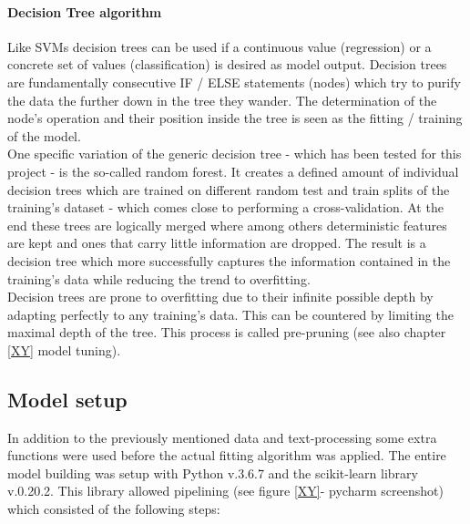 \paragraph{Decision Tree algorithm}
Like SVMs decision trees can be used if a continuous value (regression) or a concrete set of values (classification) is desired as model output. Decision trees are fundamentally consecutive IF / ELSE statements (nodes) which try to purify the data the further down in the tree they wander. The determination of the node's operation and their position inside the tree is seen as the fitting / training of the model.\\
One specific variation of the generic decision tree - which has been tested for this project - is the so-called random forest. It creates a defined amount of individual decision trees which are trained on different random test and train splits of the training's dataset - which comes close to performing a cross-validation. At the end these trees are logically merged where among others deterministic features are kept and ones that carry little information are dropped. The result is a decision tree which more successfully captures the information contained in the training's data while reducing the trend to overfitting.\\
Decision trees are prone to overfitting due to their infinite possible depth by adapting perfectly to any training's data. This can be countered by limiting the maximal depth of the tree. This process is called pre-pruning (see also chapter \ref{XY} model tuning).

\subsection{Model setup} \label{model_setup}
In addition to the previously mentioned data and text-processing some extra functions were used before the actual fitting algorithm was applied. The entire model building was setup with Python v.3.6.7 and the scikit-learn library v.0.20.2. This library allowed pipelining (see figure \ref{XY}- pycharm screenshot) which consisted of the following steps:

